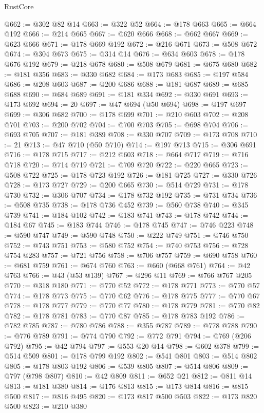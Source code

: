 \begin{lexlean}{RustCore}
\begin{coremodule}
@662 := @302 @82 @14
@663 := @322 @52
@664 := @178 @663
@665 := @664 @192
@666 := @214 @665
@667 := @620 @666
@668 := @662 @667
@669 := @623 @666
@671 := @178 @669 @192
@672 := @216 @671
@673 := @508 @672
@674 := @304 @673
@675 := @314 @14
@676 := @634 @603
@678 := @178 @676 @192
@679 := @218 @678
@680 := @508 @679
@681 := @675 @680
@682 := @181 @356
@683 := @330 @682
@684 := @173 @683
@685 := @197 @584
@686 := @208 @603
@687 := @200 @686
@688 := @181 @687
@689 := @685 @688
@690 := @684 @689
@691 := @181 @334
@692 := @330 @691
@693 := @173 @692
@694 := 20
@697 := @47 @694 (@50 @694)
@698 := @197 @697
@699 := @306 @682
@700 := @178 @699
@701 := @210 @603
@702 := @208 @701
@703 := @200 @702
@704 := @700 @703
@705 := @698 @704
@706 := @693 @705
@707 := @181 @389
@708 := @330 @707
@709 := @173 @708
@710 := 21
@713 := @47 @710 (@50 @710)
@714 := @197 @713
@715 := @306 @691
@716 := @178 @715
@717 := @212 @603
@718 := @664 @717
@719 := @716 @718
@720 := @714 @719
@721 := @709 @720
@722 := @220 @665
@723 := @508 @722
@725 := @178 @723 @192
@726 := @181 @725
@727 := @330 @726
@728 := @173 @727
@729 := @200 @665
@730 := @514 @729
@731 := @178 @730
@732 := @306 @707
@734 := @178 @732 @192
@735 := @731 @734
@736 := @508 @735
@738 := @178 @736 @452
@739 := @560 @738
@740 := @345 @739
@741 := @184 @102
@742 := @183 @741
@743 := @178 @742
@744 := @184 @67
@745 := @183 @744
@746 := @178 @745
@747 := @746 @223
@748 := @590 @747
@749 := @590 @748
@750 := @222 @749
@751 := @746 @750
@752 := @743 @751
@753 := @580 @752
@754 := @740 @753
@756 := @728 @754 @283
@757 := @721 @756
@758 := @706 @757
@759 := @690 @758
@760 := @681 @759
@761 := @674 @760
@763 := @660 (@668 @761)
@764 := @42 @763
@766 := @43 (@53 @139)
@767 := @296 @11
@769 := @766 @767 @205
@770 := @318 @180
@771 := @770 @52
@772 := @178 @771
@773 := @770 @57
@774 := @178 @773
@775 := @770 @62
@776 := @178 @775
@777 := @770 @67
@778 := @178 @777
@779 := @770 @77
@780 := @178 @779
@781 := @770 @82
@782 := @178 @781
@783 := @770 @87
@785 := @178 @783 @192
@786 := @782 @785
@787 := @780 @786
@788 := @355 @787
@789 := @778 @788
@790 := @776 @789
@791 := @774 @790
@792 := @772 @791
@794 := @769 (@206 @792)
@795 := @42 @794
@797 := @553 @20 @14
@798 := @602 @378
@799 := @514 @509
@801 := @178 @799 @192
@802 := @541 @801
@803 := @514 @802
@805 := @178 @803 @192
@806 := @539 @805
@807 := @514 @806
@809 := @797 (@798 @807)
@810 := @42 @809
@811 := @652 @21
@812 := @811 @14
@813 := @181 @380
@814 := @176 @813
@815 := @173 @814
@816 := @815 @500
@817 := @816 @495
@820 := @173 @817 @500 @503
@822 := @173 @820 @500
@823 := @210 @380

\end{coremodule}
\end{lexlean}
